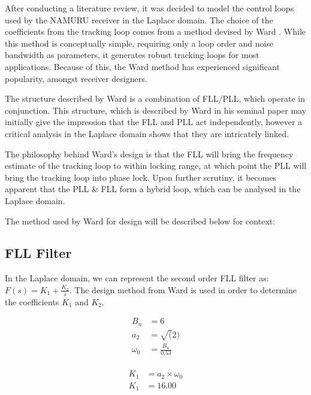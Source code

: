 

After conducting a literature review, it was decided to model the control loops used by the \ac{NAMURU} receiver in the Laplace domain. The choice of the coefficients from the tracking loop comes from a method devised by Ward \cite{Ward}. While this method is conceptually simple, requiring only a loop order and noise bandwidth as parameters, it generates robust tracking loops for most applications. Because of this, the Ward method has experienced significant popularity, amongst receiver designers.  

The structure described by Ward is a combination of FLL/PLL, which operate in conjunction. This structure, which is described by Ward in his seminal paper  may initially give the impression that the FLL and PLL act independently, however a critical analysis in the Laplace domain shows that they are intricately linked\cite{Ward}.

The philosophy behind Ward's design is that the FLL will bring the frequency estimate of the tracking loop to within locking range, at which point the PLL will bring the tracking loop into phase lock. Upon further scrutiny, it becomes apparent that the PLL \& FLL form a hybrid loop, which can be analysed in the Laplace domain.

The method used by Ward for design will be described below for context: 

\subsection{\ac{FLL} Filter}
In the Laplace domain, we can represent the second order \ac{FLL} filter as:  $F(s) = K_1 + \frac{K_2}{s}$. The design method from Ward \cite{Ward} is used in order to determine the coefficients $K_1$ and $K_2$.  

\begin{align*}
B_n &= 6\\
a_2 &= \sqrt(2)\\
\omega_{0}&=\frac{B_n}{0.53}\\
\end{align*}

\begin{equation} \label{eq1}
\begin{split}
K_1 & = a_2 \times \omega_{0}\\
K_1 & = 16.00\\
\end{split}
\end{equation}

